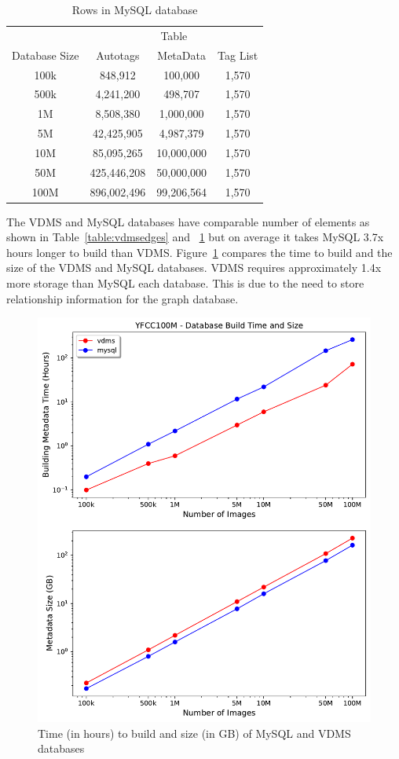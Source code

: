 \begin{table}[h]
\caption{Rows in MySQL database}
\centering
\begin{tabular}{c c c c}
\hline\hline
 & \multicolumn{3}{c}{Table}\\
\cline{2-4}
Database Size & Autotags & MetaData & Tag List\\
\hline
100k & 848,912 & 100,000 & 1,570\\
500k & 4,241,200 & 498,707 & 1,570\\
1M & 8,508,380 & 1,000,000 & 1,570\\
5M & 42,425,905 & 4,987,379 & 1,570\\
10M & 85,095,265 & 10,000,000 & 1,570\\
50M & 425,446,208 & 50,000,000 & 1,570\\
100M & 896,002,496 & 99,206,564 & 1,570\\
\hline
\end{tabular}
\label{table:mysqltables}
\end{table}

The VDMS and MySQL databases have comparable number of elements as shown in Table~\ref{table:vdmsedges} and ~\ref{table:mysqltables} but on average it takes MySQL 3.7x hours longer to build than VDMS. Figure~\ref{fig:db_time_size} compares the time to build and the size of the VDMS and MySQL databases. VDMS requires approximately 1.4x more storage than MySQL each database.  This is due to the need to store relationship information for the graph database.

\begin{figure}[]
\centering
\includegraphics[width=\columnwidth]{figures/db_time_size}
\caption{Time (in hours) to build and size (in GB) of MySQL and VDMS databases}
\label{fig:db_time_size}
\end{figure}


